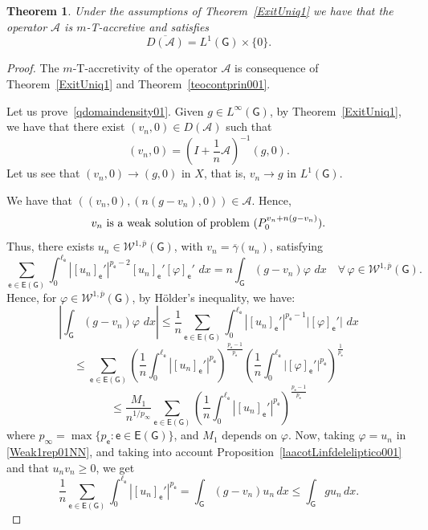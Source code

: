 \documentclass[reqno,12pt]{amsart}
\newtheorem{theorem}{Theorem}[section]
\def\e{\mathsf{e}} 	%
\newcommand{\G}{\mathsf{G}}	%
\newcommand{\E}{\mathsf{E}}	%
\numberwithin{equation}{section} %
\begin{document}
\begin{theorem}\label{Dominio} Under the assumptions of Theorem~\ref{ExitUniq1} we have that the operator $\mathcal{A}$ is  $m$-T-accretive and satisfies 
\begin{equation}\label{qdomaindensity01}
\overline{D(\mathcal{A})}=L^{1}(\G)\times\{0\}.
\end{equation}
\end{theorem}
\begin{proof}  The $m$-T-accretivity of the operator $\mathcal{A}$ is consequence of Theorem~\ref{ExitUniq1}  and Theorem~\ref{teocontprin001}. 

 Let us prove~\eqref{qdomaindensity01}.   Given $g \in L^\infty(\G)$,  by Theorem~\ref{ExitUniq1},  we have that there exist $(v_n,0) \in D(\mathcal{A})$ such that $$(v_n,0) = \left(I + \frac{1}{n} \mathcal{A}\right)^{-1}(g,0).$$ 
Let us see that $(v_n,0)\to (g,0)$ in $X$, that is, $v_n\to g$ in $L^1(\G)$.

We have that
$((v_n,0), (n(g - v_n),0)) \in \mathcal{A}$. 
Hence,
\begin{equation}\label{masclaro}
v_n \ \hbox{is a weak solution of problem} \ (P_{0}^{v_n+n(g-v_n)}). 
\end{equation}
Thus, there exists $u_n \in \mathcal{W}^{1,\overline{p}}(\G)$, with $v_n = \overline{\gamma}(u_n)$, satisfying
\begin{equation}\label{Weak1rep01NN} \sum_{\e \in\E(\G)}\int_{0}^{\ell_\e}|[u_n]_\e'|^{p_\e-2}[u_n]_\e' [\varphi]_\e' \, \,dx  = n \int_\G (g - v_n) \varphi \, \,dx  \quad \forall \, \varphi \in \mathcal{W}^{1,\overline{p}}(\G). \end{equation}
Hence,   for   $\varphi \in \mathcal{W}^{1,\overline{p}}(\G)$, by H\"older's inequality, we have:
$$\left\vert \int_\G (g - v_n) \varphi \, \,dx \right\vert \leq \frac{1}{n} \sum_{\e \in\E(\G)}\int_{0}^{\ell_\e}|[u_n]_\e'|^{p_\e-1} \vert [\varphi]_\e'\vert \, \,dx $$
$$\leq  \sum_{\e \in\E(\G)}  \left( \frac{1}{n}\int_{0}^{\ell_\e}|[u_n]_\e'|^{p_\e} \right)^{\frac{p_\e -1}{p_\e}} \left( \frac{1}{n}\int_{0}^{\ell_\e} \vert [\varphi]_\e'\vert^{p_\e} \right)^{\frac{1}{p_\e}}$$
$$\le  \frac{M_1}{n^{1/p_{\infty}}}\sum_{\e \in\E(\G)}  \left( \frac{1}{n}\int_{0}^{\ell_\e}|[u_n]_\e'|^{p_\e} \right)^{\frac{p_\e -1}{p_\e}}$$
where $p_{\infty}=\max\{p_\e:\e\in \E(\G)\}$, and $M_1$ depends on $\varphi$.
Now, taking $\varphi = u_n$ in \eqref{Weak1rep01NN}, and taking into account Proposition~\ref{laacotLinfdeleliptico001}  and that $u_nv_n\ge 0$, we get
\begin{equation}\label{theobveest001}\frac{1}{n}\sum_{\e \in\E(\G)}\int_{0}^{\ell_\e}|[u_n]_\e'|^{p_\e}   = \int_\G (g - v_n) u_n \,dx    \leq  \int_\G g u_n   \,dx .\end{equation}


\end{proof}
\end{document}
